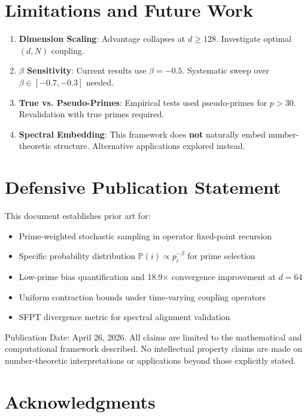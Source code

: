 \documentclass[11pt]{article}
\begin{document}
\section{Limitations and Future Work}

\begin{enumerate}
\item \textbf{Dimension Scaling}: Advantage collapses at $d \geq 128$. Investigate optimal $(d, N)$ coupling.
\item \textbf{$\beta$ Sensitivity}: Current results use $\beta = -0.5$. Systematic sweep over $\beta \in [-0.7, -0.3]$ needed.
\item \textbf{True vs. Pseudo-Primes}: Empirical tests used pseudo-primes for $p > 30$. Revalidation with true primes required.
\item \textbf{Spectral Embedding}: This framework does \textbf{not} naturally embed number-theoretic structure. Alternative applications explored instead.
\end{enumerate}

\section{Defensive Publication Statement}

This document establishes prior art for:
\begin{itemize}
\item Prime-weighted stochastic sampling in operator fixed-point recursion
\item Specific probability distribution $\mathbb{P}(i) \propto p_i^{-\beta}$ for prime selection
\item Low-prime bias quantification and 18.9× convergence improvement at $d=64$
\item Uniform contraction bounds under time-varying coupling operators
\item SFPT divergence metric for spectral alignment validation
\end{itemize}

Publication Date: April 26, 2026. All claims are limited to the mathematical and computational framework described. No intellectual property claims are made on number-theoretic interpretations or applications beyond those explicitly stated.

\section{Acknowledgments}
\end{document}

